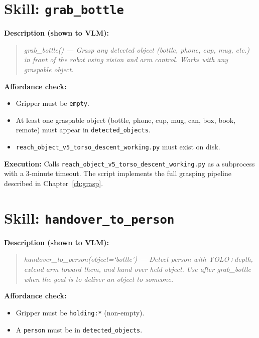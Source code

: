 \documentclass[12pt,a4paper]{report}
\begin{document}
\section{Skill: \texttt{grab\_bottle}}

\textbf{Description (shown to VLM):}
\begin{quote}
\textit{grab\_bottle() — Grasp any detected object (bottle, phone, cup, mug, etc.) in front
of the robot using vision and arm control. Works with any graspable object.}
\end{quote}

\textbf{Affordance check:}
\begin{itemize}[noitemsep]
  \item Gripper must be \texttt{empty}.
  \item At least one graspable object (bottle, phone, cup, mug, can, box, book, remote)
        must appear in \texttt{detected\_objects}.
  \item \texttt{reach\_object\_v5\_torso\_descent\_working.py} must exist on disk.
\end{itemize}

\textbf{Execution:} Calls \texttt{reach\_object\_v5\_torso\_descent\_working.py} as a
subprocess with a 3-minute timeout.  The script implements the full grasping pipeline
described in Chapter~\ref{ch:grasp}.

\section{Skill: \texttt{handover\_to\_person}}

\textbf{Description (shown to VLM):}
\begin{quote}
\textit{handover\_to\_person(object=`bottle') — Detect person with YOLO+depth, extend arm
toward them, and hand over held object. Use after grab\_bottle when the goal is to deliver
an object to someone.}
\end{quote}

\textbf{Affordance check:}
\begin{itemize}[noitemsep]
  \item Gripper must be \texttt{holding:*} (non-empty).
  \item A \texttt{person} must be in \texttt{detected\_objects}.
\end{itemize}
\end{document}
